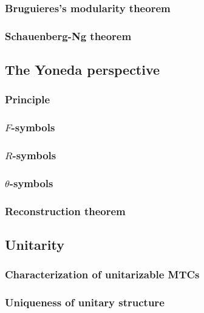 \documentclass{article}
\theoremstyle{definition}
\numberwithin{figure}{section}
\begin{document}
\subsubsection{Bruguieres's modularity theorem}

\subsubsection{Schauenberg-Ng theorem}



\subsection{The Yoneda perspective}

\subsubsection{Principle}

\subsubsection{$F$-symbols}

\subsubsection{$R$-symbols}

\subsubsection{$\theta$-symbols}

\subsubsection{Reconstruction theorem}



\subsection{Unitarity}

\subsubsection{Characterization of unitarizable MTCs}

\subsubsection{Uniqueness of unitary structure}
\end{document}
